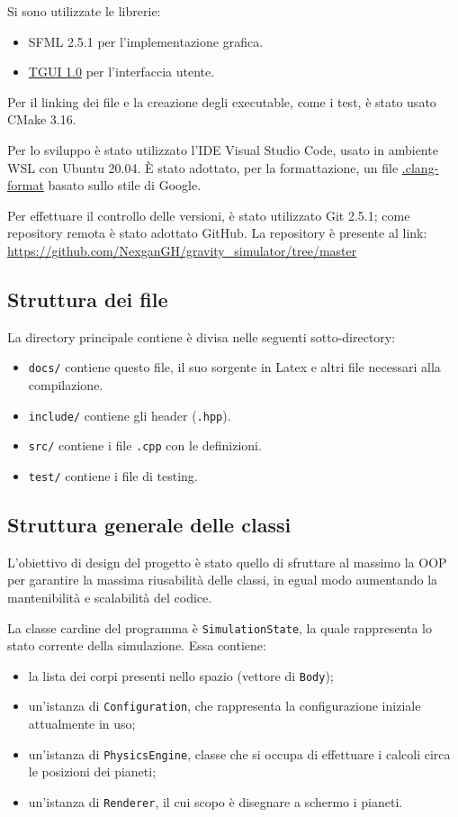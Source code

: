 \documentclass{article}
\begin{document}
Si sono utilizzate le librerie:
\begin{itemize}
    \item SFML 2.5.1 per l'implementazione grafica.
    \item \href{https://tgui.eu/tutorials/1.0/linux/}{TGUI 1.0} per l'interfaccia utente.
\end{itemize}

Per il linking dei file e la creazione degli executable, come i test, è stato usato CMake 3.16.

Per lo sviluppo è stato utilizzato l'IDE Visual Studio Code, usato in ambiente WSL con Ubuntu 20.04. È stato adottato, per la formattazione, un file \href{https://github.com/NexganGH/gravity_simulator/blob/master/.clang-format}{.clang-format} basato sullo stile di Google.

Per effettuare il controllo delle versioni, è stato utilizzato Git 2.5.1; come repository remota è stato adottato GitHub. La repository è presente al link: \url{https://github.com/NexganGH/gravity_simulator/tree/master}


\subsection{Struttura dei file}
La directory principale contiene è divisa nelle seguenti sotto-directory:
\begin{itemize}
    \item \verb|docs/| contiene questo file, il suo sorgente in Latex e altri file necessari alla compilazione.
    \item \verb|include/| contiene gli header (\verb|.hpp|).
    \item \verb|src/| contiene i file \verb|.cpp| con le definizioni.
    \item \verb|test/| contiene i file di testing.
\end{itemize}

\subsection{Struttura generale delle classi}

L'obiettivo di design del progetto è stato quello di sfruttare al massimo la OOP per garantire la massima riusabilità delle classi, in egual modo aumentando la mantenibilità e scalabilità del codice.

La classe cardine del programma è \verb|SimulationState|, la quale rappresenta lo stato corrente della simulazione. Essa contiene:
\begin{itemize}
    \item la lista dei corpi presenti nello spazio (vettore di \verb|Body|);
    \item un'istanza di \verb|Configuration|, che rappresenta la configurazione iniziale attualmente in uso;
    \item un'istanza di \verb|PhysicsEngine|, classe che si occupa di effettuare i calcoli circa le posizioni dei pianeti;
    \item un'istanza di \verb|Renderer|, il cui scopo è disegnare a schermo i pianeti.
\end{itemize}
\end{document}
